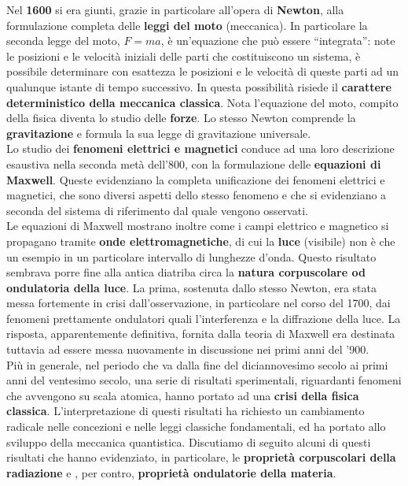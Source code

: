 Nel \textbf{1600} si era giunti, grazie in particolare all'opera di \textbf{Newton}, alla formulazione completa delle \textbf{leggi del moto} (meccanica). In particolare la seconda legge del moto, $F=ma$, è un'equazione che può essere ``integrata'': note le posizioni e le velocità iniziali delle parti che costituiscono un sistema, è possibile determinare con esattezza le posizioni e le velocità di queste parti ad un qualunque istante di tempo successivo. In questa possibilità risiede il \textbf{carattere deterministico della meccanica classica}. Nota l'equazione del moto, compito della fisica diventa lo studio delle \textbf{forze}. Lo stesso Newton comprende la \textbf{gravitazione} e formula la sua legge di gravitazione universale.\\

Lo studio dei \textbf{fenomeni elettrici e magnetici} conduce ad una loro descrizione esaustiva nella seconda metà dell'800, con la formulazione delle \textbf{equazioni di Maxwell}. Queste evidenziano la completa unificazione dei fenomeni elettrici e magnetici, che sono diversi aspetti dello stesso fenomeno e che si evidenziano a seconda del sistema di riferimento dal quale vengono osservati.\\

Le equazioni di Maxwell mostrano inoltre come i campi elettrico e magnetico si propagano tramite \textbf{onde elettromagnetiche}, di cui la \textbf{luce} (visibile) non è che un esempio in un particolare intervallo di lunghezze d'onda. Questo risultato sembrava porre fine alla antica diatriba circa la \textbf{natura corpuscolare od ondulatoria della luce}. La prima, sostenuta dallo stesso Newton, era stata messa fortemente in crisi dall'osservazione, in particolare nel corso del 1700, dai fenomeni prettamente ondulatori quali l'interferenza e la diffrazione della luce. La risposta, apparentemente definitiva, fornita dalla teoria di Maxwell era destinata tuttavia ad essere messa nuovamente in discussione nei primi anni del '900.\\

Più in generale, nel periodo che va dalla fine del diciannovesimo secolo ai primi anni del ventesimo secolo, una serie di risultati sperimentali, riguardanti fenomeni che avvengono su scala atomica, hanno portato ad una \textbf{crisi della fisica classica}. L'interpretazione di questi risultati ha richiesto un cambiamento radicale nelle concezioni e nelle leggi classiche fondamentali, ed ha portato allo sviluppo della meccanica quantistica. Discutiamo di seguito alcuni di questi risultati che hanno evidenziato, in particolare, le \textbf{proprietà corpuscolari della radiazione} e , per contro, \textbf{proprietà ondulatorie della materia}.

